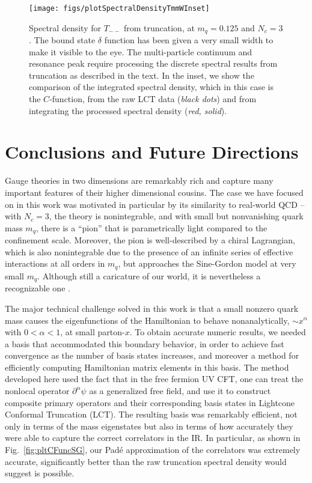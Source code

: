 \documentclass[12pt]{article}
\begin{document}
\begin{figure}[t]
\begin{center}
\texttt{[image: figs/plotSpectralDensityTmmWInset]}
\caption{Spectral density for $T_{--}$ from truncation, at $m_q = 0.125$ and $N_c=3$.  The bound state $\delta$ function has been given a very small width to make it visible to the eye.  The multi-particle continuum and resonance peak require processing the discrete spectral results from truncation as described in the text. In the inset, we show the comparison of the integrated spectral density, which in this case is the $C$-function, from the raw LCT data ({\it black dots}) and from integrating the processed spectral density ({\it red, solid}).}
\label{fig:pltSDSG}
\end{center}
\end{figure}



\section{Conclusions and Future Directions}

Gauge theories in two dimensions are remarkably rich and capture many  important features of  their higher dimensional cousins.  The case we have  focused on in this work was motivated in particular by its similarity to real-world QCD -- with $N_c=3$, the theory is nonintegrable, and with small but nonvanishing quark mass $m_q$, there is a ``pion'' that is parametrically light compared to the confinement scale.  Moreover, the pion is well-described by a chiral Lagrangian, which is also nonintegrable due to the presence of an infinite series of effective interactions at all orders in $m_q$, but  approaches the  Sine-Gordon model at very small $m_q$.  Although still a caricature of our world, it is nevertheless a recognizable one \cite{Coleman:1985rnk}.

The major technical challenge solved in this work is that a small nonzero quark mass causes the eigenfunctions of the Hamiltonian to behave nonanalytically, $\sim x^\alpha$ with $0< \alpha <1$, at small parton-$x$. To obtain accurate numeric results, we needed a basis that accommodated this boundary behavior, in order to achieve fast convergence as the number of basis states increases, and moreover a method for efficiently computing Hamiltonian matrix elements in this basis.  The method developed here used the fact that in the free fermion UV CFT, one can treat the nonlocal operator $\partial^\alpha \psi$ as a generalized free field, and use it to construct composite primary operators and their corresponding basis states in Lightcone Conformal Truncation (LCT).  The resulting basis was remarkably efficient, not only in terms of the mass eigenstates but also in terms of how accurately they were able to capture the correct correlators in the IR.  In particular, as shown in Fig.~\ref{fig:pltCFuncSG}, our Pad\'e approximation of the correlators was extremely accurate, significantly better than the raw truncation spectral density would suggest is possible. 
\end{document}
